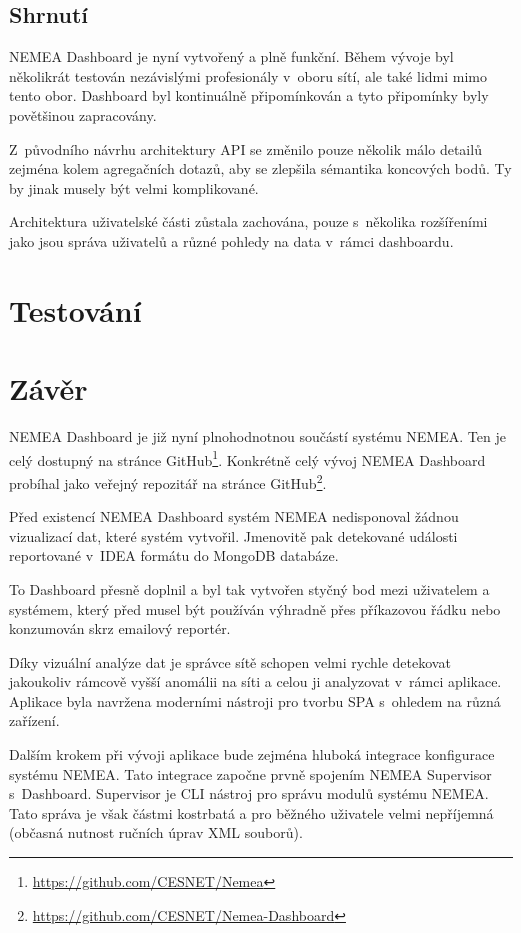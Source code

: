 \section{Shrnutí}

NEMEA Dashboard je nyní vytvořený a plně funkční. Během vývoje byl několikrát testován nezávislými profesionály v~oboru sítí, ale také lidmi mimo tento obor. Dashboard byl kontinuálně připomínkován a tyto připomínky byly povětšinou zapracovány.

Z~původního návrhu architektury API se změnilo pouze několik málo detailů zejména kolem agregačních dotazů, aby se zlepšila sémantika koncových bodů. Ty by jinak musely být velmi komplikované.

Architektura uživatelské části zůstala zachována, pouze s~několika rozšířeními jako jsou správa uživatelů a různé pohledy na data v~rámci dashboardu.

\chapter{Testování}

\chapter{Závěr}

NEMEA Dashboard je již nyní plnohodnotnou součástí systému NEMEA. Ten je celý dostupný na stránce GitHub\footnote{\url{https://github.com/CESNET/Nemea}}. Konkrétně celý vývoj NEMEA Dashboard probíhal jako veřejný repozitář na stránce GitHub\footnote{\url{https://github.com/CESNET/Nemea-Dashboard}}.

Před existencí NEMEA Dashboard systém NEMEA nedisponoval žádnou vizualizací dat, které systém vytvořil. Jmenovitě pak detekované události reportované v~IDEA formátu do MongoDB databáze.

To Dashboard přesně doplnil a byl tak vytvořen styčný bod mezi uživatelem a systémem, který před musel být používán výhradně přes příkazovou řádku nebo konzumován skrz emailový reportér.

Díky vizuální analýze dat je správce sítě schopen velmi rychle detekovat jakoukoliv rámcově vyšší anomálii na síti a celou ji analyzovat v~rámci aplikace. Aplikace byla navržena moderními nástroji pro tvorbu SPA s~ohledem na různá zařízení.

Dalším krokem při vývoji aplikace bude zejména hluboká integrace konfigurace systému NEMEA. Tato integrace započne prvně spojením NEMEA Supervisor s~Dashboard. Supervisor je CLI nástroj pro správu modulů systému NEMEA. Tato správa je však částmi kostrbatá a pro běžného uživatele velmi nepříjemná (občasná nutnost ručních úprav XML souborů).

